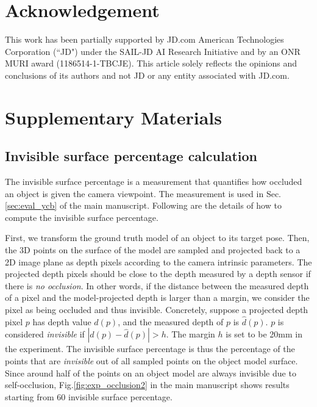 \documentclass[10pt,twocolumn,letterpaper]{article}
\begin{document}
\section*{Acknowledgement}
This work has been partially supported by JD.com American Technologies Corporation (``JD") under the SAIL-JD AI Research Initiative and by an ONR MURI award (1186514-1-TBCJE). This article solely reflects the opinions and conclusions of its authors and not JD or any entity associated with JD.com.

\printbibliography

\newpage

\section{Supplementary Materials}

\subsection{Invisible surface percentage calculation}
The invisible surface percentage is a measurement that quantifies how occluded an object is given the camera viewpoint. The measurement is used in Sec.\ref{sec:eval_ycb} of the main manuscript. Following are the details of how to compute the invisible surface percentage.

First, we transform the ground truth model of an object to its target pose. Then, the 3D points on the surface of the model are sampled and projected back to a 2D image plane as depth pixels according to the camera intrinsic parameters. The projected depth pixels should be close to the depth measured by a depth sensor if there is \emph{no occlusion}. In other words, if the distance between the measured depth of a pixel and the model-projected depth is larger than a margin, we consider the pixel as being occluded and thus invisible. Concretely, suppose a projected depth pixel $p$ has depth value $d(p)$, and the measured depth of $p$ is $\hat{d}(p)$. $p$ is considered \emph{invisible} if $|d(p) - \hat{d}(p)| > h$. The margin $h$ is set to be 20mm in the experiment.  The invisible surface percentage is thus the percentage of the points that are \emph{invisible} out of all sampled points on the object model surface. Since around half of the points on an object model are always invisible due to self-occlusion, Fig.\ref{fig:exp_occlusion2} in the main manuscript shows results starting from $60$ invisible surface percentage.
\end{document}
